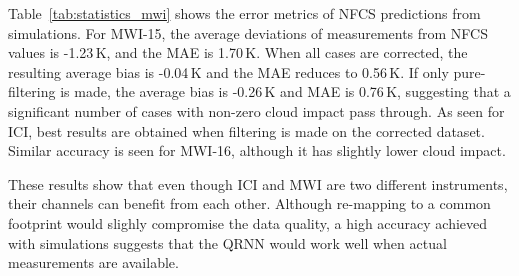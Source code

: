 \documentclass[amt, manuscript]{copernicus}
\begin{document}
Table~\ref{tab:statistics_mwi} shows the error metrics of NFCS predictions from simulations. For MWI-15, the average deviations of measurements from NFCS values is -1.23\,K, and the MAE is 1.70\,K. When all cases are corrected, the resulting average bias is -0.04\,K and the MAE reduces to 0.56\,K. If only pure-filtering is made, the average bias is -0.26\,K and MAE is 0.76\,K, suggesting that a significant number of cases with non-zero cloud impact pass through. As seen for ICI, best results are obtained  when filtering is made on the corrected dataset. Similar accuracy is seen for MWI-16, although it has slightly lower cloud impact. 

These results show that even though ICI and MWI are two different instruments, their channels can benefit from each other. Although re-mapping to a common footprint would slighly compromise the data quality, a high accuracy achieved with simulations suggests that the QRNN would work well when actual measurements are available.
\end{document}
